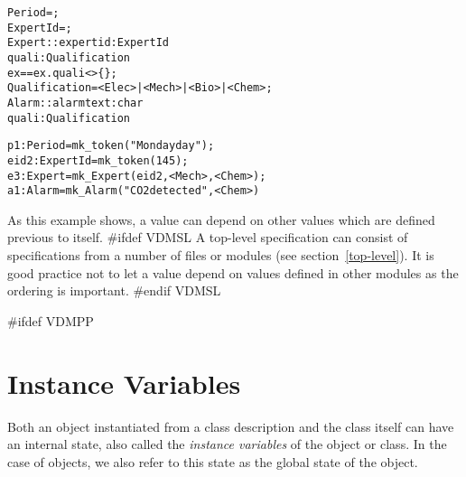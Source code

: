 \documentclass[\pformat,12pt]{article}
\begin{document}
\begin{description}
\begin{alltt}
     Period = ;
     ExpertId = ;
     Expert :: expertid : ExpertId
               quali :  Qualification
      ex == ex.quali <> \{\};
     Qualification = <Elec> | <Mech> | <Bio> | <Chem>;
     Alarm :: alarmtext :  char
              quali : Qualification

 
     \PUBLIC p1: Period = mk_token("Monday day");
     \PRIVATE eid2 : ExpertId = mk_token(145);
     \PROTECTED e3 : Expert = mk_Expert(eid2, { <Mech>, <Chem> });
     \mbox{} a1 : Alarm = mk_Alarm("CO2 detected", <Chem>)
\end{alltt}
  As this example shows, a value can depend on other values which are
  defined previous to itself.
#ifdef VDMSL
  A top-level specification can consist of
  specifications from a number of files or modules (see
  section~\ref{top-level}).  It is good practice not to let a value depend
  on values defined in other modules as the ordering is important.
#endif VDMSL
\end{description}

#ifdef VDMPP
\section{Instance Variables}
\label{sec:ivars}

Both an object instantiated from a class description and the class
itself can have an internal state, also called the \emph{instance
  variables} of the object or class. In the case of objects, we also
refer to this state as the global state of the object.
\end{document}
